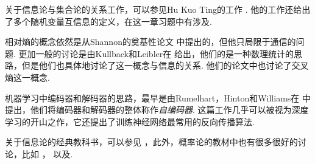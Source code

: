 关于信息论与集合论的关系工作，可以参见Hu Kuo Ting的工作 \cite{tingAmountInformation1962a}. 他的工作还给出了多个随机变量互信息的定义，在这一章习题中有涉及.

相对熵的概念依然是从Shannon的奠基性论文 \cite{shannonMathematicalTheoryCommunication1948} 中提出的，但他只局限于通信的问题. 更加一般的讨论是由Kullback和Leibler在 \cite{kullbackInformationSufficiency1951} 给出，他们的是一种数理统计的思路，但是他们也具体地讨论了这一概念与信息的关系. 他们的论文中也讨论了交叉熵这一概念. 

机器学习中编码器和解码器的思路，最早是由Rumelhart，Hinton和Williams在 \cite{rumelhartLearningInternalRepresentations1986} 中提出，他们将编码器和解码器的整体称作\emph{自编码器}. 这篇工作几乎可以被视为深度学习的开山之作，它还提出了训练神经网络最常用的反向传播算法.

关于信息论的经典教科书，可以参见 \cite{coverElementsInformationTheory2012} ，此外，概率论的教材中也有很多很好的讨论，比如 \cite{jaynesProbabilityTheoryLogic2002}，\cite{shiryaevProbability1996} 以及\cite{LiXianPingGaiLuLunJiChu2010}.